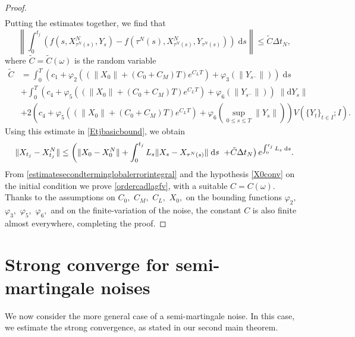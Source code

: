 \documentclass[reqno,12pt]{amsart}
\theoremstyle{plain} %
\theoremstyle{definition} %
\begin{document}
\begin{proof}
\begin{align*}
    \end{align*}
    Putting the estimates together, we find that
    \[
        \left\|\int_0^{t_j} \left( f(s, X_{\tau^N(s)}^N, Y_s) - f(\tau^N(s), X_{\tau^N(s)}^N, Y_{\tau^N(s)}) \right)\;\mathrm{d}s\right\| \leq \tilde C \Delta t_N,
    \]
    where $\tilde C=\tilde C(\omega)$ is the random variable
    \begin{equation}
        \begin{aligned}
            \tilde C & = \int_0^T \left(c_1 + \varphi_2\left(\left(\|X_0\| + (C_0 + C_M) T \right)e^{C_L T}\right) + \varphi_3(\|Y_{s^-}\|)\right)\;\mathrm{d}s \\
            & + \int_0^T \left(c_4 + \varphi_5\left(\left(\|X_0\| + (C_0 + C_M) T \right)e^{C_L T}\right) + \varphi_6(\|Y_{s^-}\|)\right)\;\|\mathrm{d}Y_s\| \\
            & + 2\left(c_4 + \varphi_5\left(\left(\|X_0\| + (C_0 + C_M) T \right)e^{C_L T}\right) + \varphi_6\left(\sup_{0\leq s \leq T}\|Y_s\|\right)\right) V(\{Y_t\}_{t\in I}; I).
        \end{aligned}
    \end{equation}
    Using this estimate in \eqref{Etjbasicbound}, we obtain
    \[
        \|X_{t_j} - X_{t_j}^N\| \leq \left( \|X_0 - X_0^N\| + \int_0^{t_j} L_s\|X_s - X_{\tau^N(s)}\| \;\mathrm{d}s \right. \\
            \left. + \tilde C \Delta t_N\right) e^{\int_0^{t_j} L_s\;\mathrm{d}s}.
    \]
    From \eqref{estimatesecondterminglobalerrorintegral} and the hypothesis \eqref{X0conv} on the initial condition we prove \eqref{ordercadlagfv}, with a suitable $C=C(\omega)$. Thanks to the assumptions on $C_0,$ $C_M,$ $C_L,$ $X_0,$ on the bounding functions $\varphi_2,$ $\varphi_3,$ $\varphi_5,$ $\varphi_6,$ and on the finite-variation of the noise, the constant $C$ is also finite almost everywhere, completing the proof.
\end{proof}

\section{Strong converge for semi-martingale noises}
\label{secsubmartingale}

We now consider the more general case of a semi-martingale noise. In this case, we estimate the strong convergence, as stated in our second main theorem.
\end{document}
